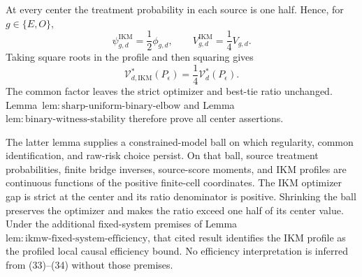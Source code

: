 At every center the treatment probability in each source is one half. Hence, for \(g\in\{E,O\}\),
\[
 \psi_{g,d}^{\mathrm{IKM}}=\frac{1}{2}\phi_{g,d},
 \qquad
 V_{g,d}^{\mathrm{IKM}}=\frac{1}{4}V_{g,d}.               \tag{33}
\]
Taking square roots in the profile and then squaring gives
\[
 \mathcal V_{d,\mathrm{IKM}}^*(P_\epsilon)
 =\frac{1}{4}\mathcal V_d^*(P_\epsilon).                  \tag{34}
\]
The common factor leaves the strict optimizer and best-tie ratio unchanged. Lemma~\(\mathrm{lem{:}sharp\text{-}uniform\text{-}binary\text{-}elbow}\) and Lemma~\(\mathrm{lem{:}binary\text{-}witness\text{-}stability}\) therefore prove all center assertions.

The latter lemma supplies a constrained-model ball on which regularity, common identification, and raw-risk choice persist. On that ball, source treatment probabilities, finite bridge inverses, source-score moments, and IKM profiles are continuous functions of the positive finite-cell coordinates. The IKM optimizer gap is strict at the center and its ratio denominator is positive. Shrinking the ball preserves the optimizer and makes the ratio exceed one half of its center value. Under the additional fixed-system premises of Lemma~\(\mathrm{lem{:}ikmw\text{-}fixed\text{-}system\text{-}efficiency}\), that cited result identifies the IKM profile as the profiled local causal efficiency bound. No efficiency interpretation is inferred from (33)--(34) without those premises.